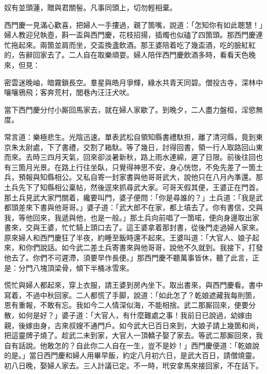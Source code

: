\begin{myquote} 
奴有並頭蓮，贈與君關髻。凡事同頭上，切勿輕相棄。
\end{myquote} 

西門慶一見滿心歡喜，把婦人一手摟過，親了箇嘴，說道：「怎知你有如此聰慧！」{}婦人教迎兒執壺，斟一盃與西門慶，花枝招揚，插燭也似磕了四箇頭。那西門慶連忙拖起來。兩箇並肩而坐，交盃換盞飲酒。那王婆陪着吃了幾盃酒，吃的臉紅紅的，告辭回家去了。二人自在取樂頑耍。婦人陪伴西門慶飲酒多時，看看天色晚來，但見：

\begin{myquote} 
密雲迷晚岫，暗霧鎖長空。羣星與皓月爭輝，綠水共青天同碧。僧投古寺，深林中嚷嚷鴉飛；客奔荒村，閭巷內汪汪犬吠。
\end{myquote} 

當下西門慶分付小厮回馬家去，就在婦人家歇了。到晚夕，二人盡力盤桓，淫慾無度。

常言道：樂極悲生。光陰迅速。單表武松自領知縣書禮馱担，離了清河縣，竟到東京朱太尉處，下了書禮，交割了箱馱。等了幾日，討得回書，領一行人取路回山東而來。去時三四月天氣，回來卻淡暑新秋，路上雨水連綿，遲了日限。前後往回也有三箇月光景。在路上行往坐臥，只覺得神思不安，身心恍惚，{}不免先差了一箇土兵，預報與知縣相公。又私自寄一封家書與他哥哥武大，說他只在八月內準還。那土兵先下了知縣相公稟帖，然後逕來抓尋武大家。可哥天假其便，王婆正在門首。那土兵見武大家門關着，纔要叫門，婆子便問：「你是尋誰的？」土兵道：「我是武都頭差來下書與他哥哥。」婆子道：「武大郎不在家，都上墳去了。你有書信，交與我，等他回來，我遞與他，也是一般。」那土兵向前唱了一箇喏，便向身邊取出家書來，交與王婆，忙忙騎上頭口去了。這王婆拿着那封書，從後門走過婦人家來。原來婦人和西門慶狂了半夜，約睡至飯時還不起來。王婆叫道：「大官人、娘子起來，和你們說話。如今武二差土兵寄書來與他哥哥，說他不久就到。我接下，打發他去了。你們不可遲滯，須要早作長便。」那西門慶不聽萬事皆休，聽了此言，正是：分門八塊頂梁骨，傾下半桶冰雪來。

慌忙與婦人都起來，穿上衣服，請王婆到房內坐下。取出書來，與西門慶看。書中寫着，不過中秋回家。二人都慌了手脚，說道：「如此怎了？乾娘遮藏我每則箇，恩有重報，不敢有忘。我如今二人情深似海，不能相捨。武二那厮回來，便要分散，如何是好？」婆子道：「大官人，有什麼難處之事！我前日已說過，幼嫁由親，後嫁由身，古來叔嫂不通門戶。如今武大已百日來到，大娘子請上幾箇和尚，把這靈牌子燒了。趁武二未到家，大官人一頂轎子娶了家去。等武二那厮回來，我自有話說。他敢怎的？自此你二人自在一生，豈不是妙！」西門慶便道：「乾娘說的是。」當日西門慶和婦人用畢早飯，約定八月初六日，是武大百日，請僧燒靈。初八日晚，娶婦人家去。三人計議已定。不一時，玳安拿馬來接回家，不在話下。

